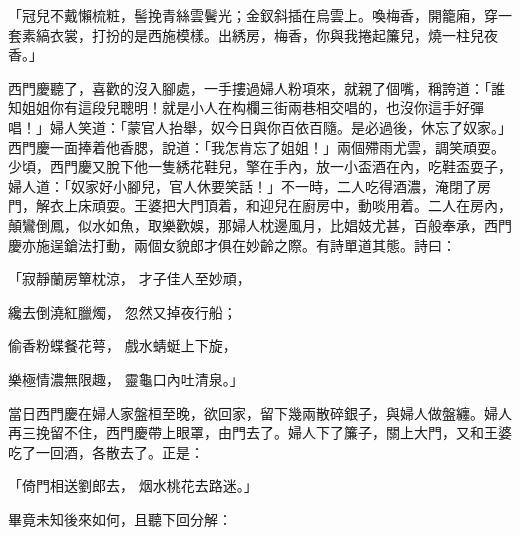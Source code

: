「冠兒不戴懶梳粧，髻挽青絲雲鬢光；金釵斜插在烏雲上。喚梅香，開籠廂，穿一套素縞衣裳，打扮的是西施模樣。出綉房，梅香，你與我捲起簾兒，燒一柱兒夜香。」

西門慶聽了，喜歡的沒入腳處，一手摟過婦人粉項來，就親了個嘴，稱誇道：「誰知姐姐你有這段兒聰明！就是小人在构欄三街兩巷相交唱的，也沒你這手好彈唱！」婦人笑道：「蒙官人抬舉，奴今日與你百依百隨。是必過後，休忘了奴家。」西門慶一面捧着他香腮，說道：「我怎肯忘了姐姐！」兩個殢雨尤雲，調笑頑耍。少頃，西門慶又脫下他一隻綉花鞋兒，擎在手內，放一小盃酒在內，吃鞋盃耍子，婦人道：「奴家好小腳兒，官人休要笑話！」不一時，二人吃得酒濃，淹閉了房門，解衣上床頑耍。王婆把大門頂着，和迎兒在廚房中，動啖用着。二人在房內，顛鸞倒鳳，似水如魚，取樂歡娛，那婦人枕邊風月，比娼妓尤甚，百般奉承，西門慶亦施逞鎗法打動，兩個女貌郎才俱在妙齡之際。有詩單道其態。詩曰：

「寂靜蘭房簞枕涼，  才子佳人至妙頑，

纔去倒澆紅臘燭，  忽然又掉夜行船；

偷香粉蝶餐花萼，  戲水蜻蜓上下旋，

樂極情濃無限趣，  靈龜口內吐清泉。」

當日西門慶在婦人家盤桓至晚，欲回家，留下幾兩散碎銀子，與婦人做盤纏。婦人再三挽留不住，西門慶帶上眼罩，由門去了。婦人下了簾子，關上大門，又和王婆吃了一回酒，各散去了。正是：

「倚門相送劉郎去，  烟水桃花去路迷。」

畢竟未知後來如何，且聽下回分解：